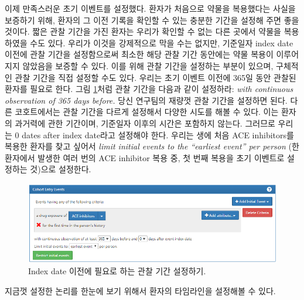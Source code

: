 \documentclass[10.5pt]{book}
\theoremstyle{definition}
\theoremstyle{definition}
\theoremstyle{definition}
\theoremstyle{remark}
\begin{document}
이제 만족스러운 초기 이벤트를 설정했다. 환자가 처음으로 약물을
복용했다는 사실을 보증하기 위해, 환자의 그 이전 기록을 확인할 수 있는
충분한 기간을 설정해 주면 좋을 것이다. 짧은 관찰 기간을 가진 환자는
우리가 확인할 수 없는 다른 곳에서 약물을 복용하였을 수도 있다. 우리가
이것을 강제적으로 막을 수는 없지만, 기준일자 index date 이전에 관찰
기간을 설정함으로써 최소한 해당 관찰 기간 동안에는 약물 복용이
이루어지지 않았음을 보증할 수 있다. 이를 위해 관찰 기간을 설정하는
부분이 있으며, 구체적인 관찰 기간을 직접 설정할 수도 있다. 우리는 초기
이벤트 이전에 365일 동안 관찰된 환자를 필요로 한다. 그림
\ref{fig:initialEventAce}처럼 관찰 기간을 다음과 같이 설정하라:
\emph{with continuous observation of 365 days before.} 당신 연구팀의
재량껏 관찰 기간을 설정하면 된다. 다른 코호트에서는 관찰 기간을 다르게
설정해서 다양한 시도를 해볼 수 있다. 이는 환자의 과거력에 관한 기간이며,
기준일자 이후의 시간은 포함하지 않는다. 그러므로 우리는 0 dates after
index date라고 설정해야 한다. 우리는 생에 처음 ACE inhibitors를 복용한
환자를 찾고 싶어서 \emph{limit initial events to the ``earliest event''
per person} (한 환자에서 발생한 여러 번의 ACE inhibitor 복용 중, 첫 번째
복용을 초기 이벤트로 설정하는 것)으로 설정한다.

\begin{figure}

{\centering \includegraphics[width=1\linewidth]{images/Cohorts/initialEventAce} 

}

\caption{Index date 이전에 필요로 하는 관찰 기간 설정하기.}\label{fig:initialEventAce}
\end{figure}

지금껏 설정한 논리를 한눈에 보기 위해서 환자의 타임라인을 설정해볼 수
있다.
\end{document}
